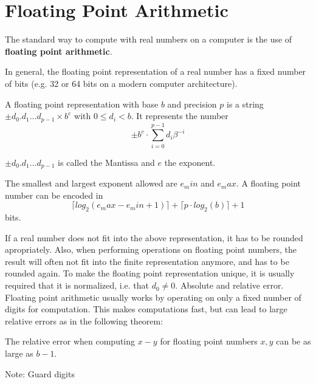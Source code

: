 \section{Floating Point Arithmetic}
The standard way to compute with real numbers on a computer is the use 
of \textbf{floating point arithmetic}. 

In general, the floating point representation of a real number has a fixed number of bits (e.g. 32 or 64 bits on a modern computer architecture).
\begin{definition}\label{def: floating point number}
	A floating point representation with base $b$ and precision $p$
	is a string $\pm d_0 . d_1 \dots d_{p-1} \times b^e$ with $0 \leq d_i < b$.	
	It represents the number
	$$ \pm b^e \cdot \sum_{i=0}^{p-1} d_i\beta^{-i} $$ 

	$\pm d_0 . d_1 \dots d_{p-1}$ is called the Mantissa and $e$ the exponent.
	
	The smallest and largest exponent allowed are $e_min$ and $e_max$.
	A floating point number can be encoded in
	$$ \lceil log_2(e_max-e_min+1) \rceil + \lceil  p \cdot log_2 (b) \rceil + 1 $$
	bits.
\end{definition}
If a real number does not fit into the above representation, it has to be rounded apropriately.
Also, when performing operations on floating point numbers, the result will often not fit into the finite representation anymore, 
and has to be rounded again.
To make the floating point representation unique, it is usually required that it is normalized, i.e. that $d_0 \neq 0$.
Absolute and relative error.
Floating point arithmetic usually works by operating on only a fixed number of digits for computation.
This makes computations fast, but can lead to large relative errors as in the following theorem: 
\begin{theorem}
	The relative error when computing $x-y$ for floating point numbers $x,y$ can be as large as $b-1$. 
\end{theorem}
Note: Guard digits
